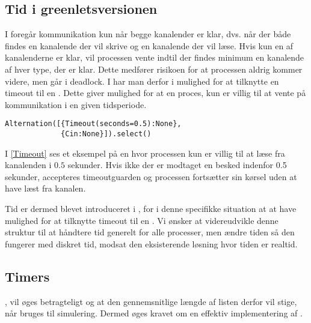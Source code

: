 
\subsection{Tid i greenletsversionen} 
I \pycsp foregår kommunikation
kun når begge kanalender er klar, dvs. når der både findes en
kanalende der vil skrive og en kanalende der vil læse. Hvis
kun en af kanalenderne er klar, vil processen vente indtil der findes
minimum en kanalende af hver type, der er klar. Dette medfører
risikoen for at processen aldrig kommer videre, men går i deadlock.
I \pycsp har man derfor i  mulighed for at
tilknytte en timeout til en . Dette giver mulighed for
at en proces, kun er villig til at vente på kommunikation i en
given tidsperiode. 
\begin{lstlisting}[float=hbtp, label=Timeout,caption=Timeout i Alternation (fra dokumentationen til PyCSP)]
Alternation([{Timeout(seconds=0.5):None}, 
             {Cin:None}]).select()
\end{lstlisting}

I \cref{Timeout} ses et eksempel på en  hvor processen kun er villig
til at læse fra kanalenden  i $0.5$ sekunder. Hvis ikke der
er modtaget en besked indenfor 0.5 sekunder, accepteres timeoutguarden
og processen fortsætter sin kørsel uden at have læst fra kanalen.

Tid er dermed blevet introduceret i \pycsp, for i denne specifikke situation at at have
mulighed for at tilknytte timeout til en . Vi ønsker
at videreudvikle denne struktur til at håndtere tid generelt for alle
processer, men ændre tiden så den fungerer med diskret tid, modsat den eksisterende
løsning hvor tiden er realtid.

\subsection{Timers}  
, vil øges betragteligt og at den gennemsnitlige
længde af listen derfor vil stige, når \pycsp bruges til simulering. Dermed 
øges kravet om en effektiv implementering af . 

